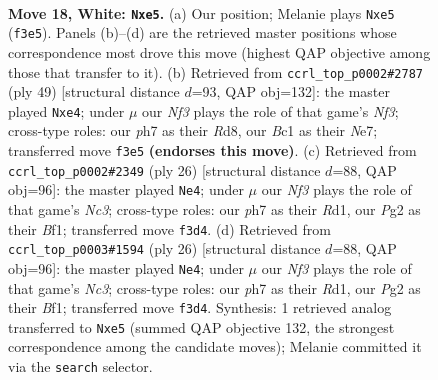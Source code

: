 \documentclass[11pt]{article}
\begin{document}
\clearpage

\begin{figure}[p]\centering
\begin{subfigure}{0.46\textwidth}\centering
\resizebox{\linewidth}{!}{%
\newchessgame
\chessboard[
  setfen={r1b1kb1r/2q3pp/1p3p2/p3n3/3p3P/1Q3N2/PP3PP1/RNB1R1K1 w q - 0 18},
  showmover=false,
  pgfstyle=straightmove, color=movearrow, markmove={f3-e5}
]}
\caption{}
\end{subfigure}\hfill
\begin{subfigure}{0.46\textwidth}\centering
\resizebox{\linewidth}{!}{%
\newchessgame
\chessboard[
  setfen={3r1rk1/4n1pp/p1qbpn2/1p6/2pPNPP1/P3PQ2/7P/RB2BR1K b - - 4 25},
  showmover=false,
  pgfstyle=straightmove, color=movearrow, markmove={f6-e4}
]}
\caption{}
\end{subfigure}
\\[4pt]
\begin{subfigure}{0.46\textwidth}\centering
\resizebox{\linewidth}{!}{%
\newchessgame
\chessboard[
  setfen={r1bqr1k1/p4pbp/2p3p1/2Bnp3/8/2N2P2/PPPQ2PP/2KR1B1R w - - 2 14},
  showmover=false,
  pgfstyle=straightmove, color=movearrow, markmove={c3-e4}
]}
\caption{}
\end{subfigure}\hfill
\begin{subfigure}{0.46\textwidth}\centering
\resizebox{\linewidth}{!}{%
\newchessgame
\chessboard[
  setfen={r1bqr1k1/p4pbp/2p3p1/2Bnp3/8/2N2P2/PPPQ2PP/2KR1B1R w - - 2 14},
  showmover=false,
  pgfstyle=straightmove, color=movearrow, markmove={c3-e4}
]}
\caption{}
\end{subfigure}
\caption{\textbf{Move 18, White: \texttt{Nxe5}.} (a) Our position; Melanie plays \texttt{Nxe5} (\texttt{f3e5}). Panels (b)--(d) are the retrieved master positions whose correspondence most drove this move (highest QAP objective among those that transfer to it). (b) Retrieved from \texttt{ccrl\_top\_p0002\#2787} (ply 49) [structural distance $d$=93, QAP obj=132]: the master played \texttt{Nxe4}; under $\mu$ our \emph{Nf3} plays the role of that game's \emph{Nf3}; cross-type roles: our \emph{p}h7 as their \emph{R}d8, our \emph{B}c1 as their \emph{N}e7; transferred move \texttt{f3e5} \textbf{(endorses this move)}. (c) Retrieved from \texttt{ccrl\_top\_p0002\#2349} (ply 26) [structural distance $d$=88, QAP obj=96]: the master played \texttt{Ne4}; under $\mu$ our \emph{Nf3} plays the role of that game's \emph{Nc3}; cross-type roles: our \emph{p}h7 as their \emph{R}d1, our \emph{P}g2 as their \emph{B}f1; transferred move \texttt{f3d4}. (d) Retrieved from \texttt{ccrl\_top\_p0003\#1594} (ply 26) [structural distance $d$=88, QAP obj=96]: the master played \texttt{Ne4}; under $\mu$ our \emph{Nf3} plays the role of that game's \emph{Nc3}; cross-type roles: our \emph{p}h7 as their \emph{R}d1, our \emph{P}g2 as their \emph{B}f1; transferred move \texttt{f3d4}. Synthesis: 1 retrieved analog transferred to \texttt{Nxe5} (summed QAP objective 132, the strongest correspondence among the candidate moves); Melanie committed it via the \texttt{search} selector.}
\label{fig:thought-m34}
\end{figure}
\end{document}
